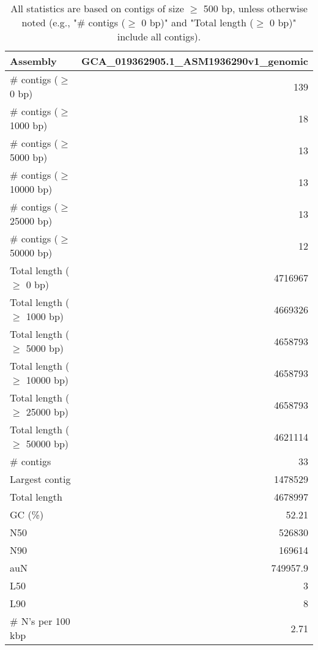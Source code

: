 \documentclass[12pt,a4paper]{article}
\begin{document}
\begin{table}[ht]
\begin{center}
\caption{All statistics are based on contigs of size $\geq$ 500 bp, unless otherwise noted (e.g., "\# contigs ($\geq$ 0 bp)" and "Total length ($\geq$ 0 bp)" include all contigs).}
\begin{tabular}{|l*{1}{|r}|}
\hline
Assembly & GCA\_019362905.1\_ASM1936290v1\_genomic \\ \hline
\# contigs ($\geq$ 0 bp) & 139 \\ \hline
\# contigs ($\geq$ 1000 bp) & 18 \\ \hline
\# contigs ($\geq$ 5000 bp) & 13 \\ \hline
\# contigs ($\geq$ 10000 bp) & 13 \\ \hline
\# contigs ($\geq$ 25000 bp) & 13 \\ \hline
\# contigs ($\geq$ 50000 bp) & 12 \\ \hline
Total length ($\geq$ 0 bp) & 4716967 \\ \hline
Total length ($\geq$ 1000 bp) & 4669326 \\ \hline
Total length ($\geq$ 5000 bp) & 4658793 \\ \hline
Total length ($\geq$ 10000 bp) & 4658793 \\ \hline
Total length ($\geq$ 25000 bp) & 4658793 \\ \hline
Total length ($\geq$ 50000 bp) & 4621114 \\ \hline
\# contigs & 33 \\ \hline
Largest contig & 1478529 \\ \hline
Total length & 4678997 \\ \hline
GC (\%) & 52.21 \\ \hline
N50 & 526830 \\ \hline
N90 & 169614 \\ \hline
auN & 749957.9 \\ \hline
L50 & 3 \\ \hline
L90 & 8 \\ \hline
\# N's per 100 kbp & 2.71 \\ \hline
\end{tabular}
\end{center}
\end{table}
\end{document}
